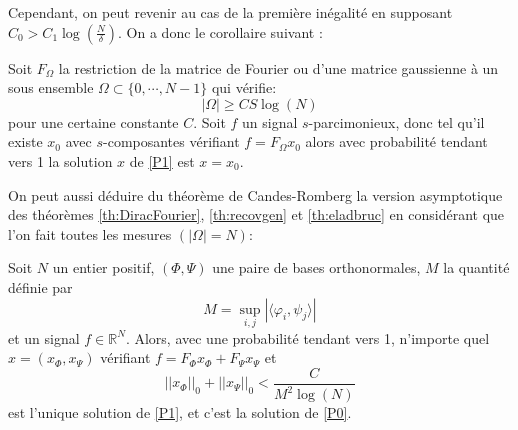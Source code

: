Cependant, on peut revenir au cas de la première inégalité en supposant $C_0> C_1\log(\frac{N}{\delta})$. 
\newline
On a donc le corollaire suivant :
\begin{theoreme}
	Soit $F_{\Omega}$ la restriction de la matrice de Fourier ou d'une matrice gaussienne à un sous ensemble $\Omega \subset \{0, \cdots, N-1\}$ qui vérifie:
	\begin{equation}
		|\Omega| \geq C S \log(N)
	\end{equation}
	pour une certaine constante $C$.
	Soit $f$ un signal $s$-parcimonieux, donc tel qu'il existe $x_0$ avec $s$-composantes vérifiant $f=F_{\Omega}x_0$ alors avec probabilité tendant vers 1 la solution $x$ de \ref{P1} est $x=x_0$.
\end{theoreme}
On peut aussi déduire du théorème de Candes-Romberg la version asymptotique des théorèmes \ref{th:DiracFourier}, \ref{th:recovgen} et \ref{th:eladbruc} en considérant que l'on fait toutes les mesures $(|\Omega| =N)$:
\begin{theoreme}\label{th:recovgen}
		Soit $N$ un entier positif, $(\Phi, \Psi)$ une paire de bases orthonormales, $M$ la quantité définie par 
		\begin{equation}
			M = \sup_{i,j} |\langle \varphi_i, \psi_j \rangle|
		\end{equation}
		et un signal $f\in \mathbb{R}^N$. Alors, avec une probabilité tendant vers 1, n'importe quel $x = (x_\Phi, x_\Psi)$ vérifiant $f = F_\Phi x_\Phi + F_\Psi x_\Psi$ et
	\begin{equation}\label{eq:cond1}
		||x_\Phi||_0 +  ||x_\Psi||_0 < \frac{C}{M^2\log(N)}
	\end{equation}
	est l'unique solution de \ref{P1}, et c'est la solution de \ref{P0}.
\end{theoreme}




